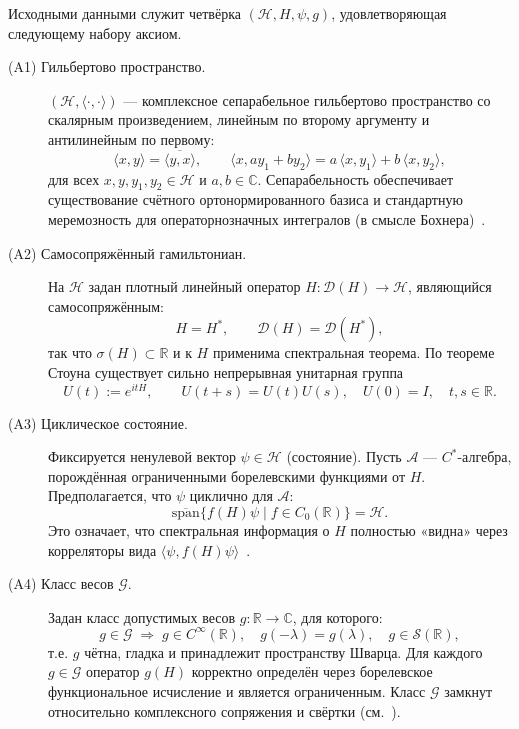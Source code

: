 \documentclass{article}
\numberwithin{equation}{section}
\theoremstyle{plain}
\theoremstyle{definition}
\theoremstyle{remark}
\def\infty{∞}\def\partial{∂}\def\sum{Σ}\def\int{∫}%
\def\cdot{·}\def\times{×}\def\pm{±}\def\mp{∓}\def\approx{≈}%
\begin{document}
\noindent
Исходными данными служит четвёрка $(\mathcal H,H,\psi,g)$, удовлетворяющая
следующему набору аксиом.

\begin{description}
  \item[(A1) Гильбертово пространство.]
  $(\mathcal H,\langle\cdot,\cdot\rangle)$ — комплексное сепарабельное
  гильбертово пространство со скалярным произведением, линейным по второму
  аргументу и антилинейным по первому:
  \begin{equation}
  \label{eq:qssc-inner-product}
  \langle x,y\rangle
  =
  \overline{\langle y,x\rangle},
  \qquad
  \langle x,ay_1+by_2\rangle
  =
  a\,\langle x,y_1\rangle + b\,\langle x,y_2\rangle,
  \end{equation}
  для всех $x,y,y_1,y_2\in\mathcal H$ и $a,b\in\mathbb C$.
  Сепарабельность обеспечивает существование счётного ортонормированного
  базиса и стандартную меремозность для операторнозначных интегралов
  (в смысле Бохнера)~\cite{HillePhillips1957}.

  \item[(A2) Самосопряжённый гамильтониан.]
  На $\mathcal H$ задан плотный линейный оператор $H:\mathcal D(H)\to\mathcal H$,
  являющийся самосопряжённым:
  \begin{equation}
  \label{eq:qssc-selfadjoint}
  H = H^\ast,
  \qquad
  \mathcal D(H)=\mathcal D(H^\ast),
  \end{equation}
  так что $\sigma(H)\subset\mathbb R$ и к $H$ применима спектральная теорема.
  По теореме Стоуна существует сильно непрерывная унитарная группа
  \begin{equation}
  \label{eq:qssc-unitary-group}
  U(t) := e^{itH},
  \qquad
  U(t+s)=U(t)U(s),
  \quad
  U(0)=I,
  \quad
  t,s\in\mathbb R.
  \end{equation}

  \item[(A3) Циклическое состояние.]
  Фиксируется ненулевой вектор $\psi\in\mathcal H$ (состояние). Пусть
  $\mathcal A$ — $C^\ast$-алгебра, порождённая ограниченными борелевскими
  функциями от $H$. Предполагается, что $\psi$ циклично для $\mathcal A$:
  \begin{equation}
  \label{eq:qssc-cyclic}
  \overline{\mathrm{span}}\{f(H)\psi \mid f\in C_0(\mathbb R)\}
  =
  \mathcal H.
  \end{equation}
  Это означает, что спектральная информация о $H$ полностью «видна» через
  корреляторы вида $\langle\psi,f(H)\psi\rangle$~\cite{Dixmier1981}.

  \item[(A4) Класс весов $\mathcal G$.]
  Задан класс допустимых весов $g:\mathbb R\to\mathbb C$, для которого:
  \begin{equation}
  \label{eq:qssc-weights}
  g\in\mathcal G
  \;\Longrightarrow\;
  g\in C^\infty(\mathbb R),\quad
  g(-\lambda)=g(\lambda),\quad
  g\in\mathcal S(\mathbb R),
  \end{equation}
  т.е. $g$ чётна, гладка и принадлежит пространству Шварца. Для каждого
  $g\in\mathcal G$ оператор $g(H)$ корректно определён через борелевское
  функциональное исчисление и является ограниченным. Класс $\mathcal G$
  замкнут относительно комплексного сопряжения и свёртки
  (см.~\cite{Hormander1983}).


\end{description}
\end{document}
